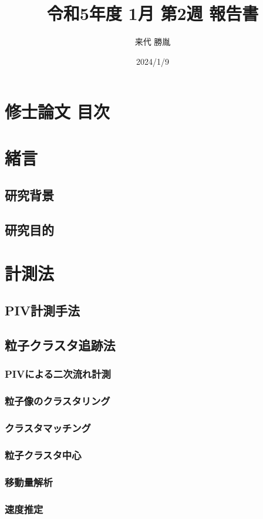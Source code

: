 \documentclass[twocolumn,a4j]{jsarticle}
\author{来代 勝胤}
\title{令和5年度 1月 第2週 報告書}
\date{2024/1/9}
\begin{document}
\columnseprule=0.1mm
\maketitle

\section*{修士論文 目次}
\section{緒言}
\subsection{研究背景}
\subsection{研究目的}

\section{計測法}
\subsection{PIV計測手法}
 \baselineskip
\subsection{粒子クラスタ追跡法}
\subsubsection{PIVによる二次流れ計測}
\subsubsection{粒子像のクラスタリング}
\subsubsection{クラスタマッチング}
\subsubsection{粒子クラスタ中心}
\subsubsection{移動量解析}
\subsubsection{速度推定}
\end{document}
